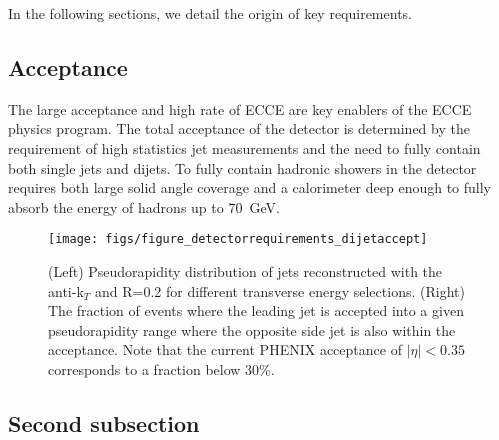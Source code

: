 In the following sections, we detail the origin of key requirements.

\subsection{Acceptance}

The large acceptance and high rate of ECCE are key enablers of the ECCE 
physics program.
The total
acceptance of the detector is determined by the requirement of high
statistics jet measurements and the need to fully contain both single
jets and dijets.  To fully contain hadronic showers in the detector
requires both large solid angle coverage and a calorimeter deep enough
to fully absorb the energy of hadrons up to 70~GeV.

\begin{figure}[hbt!]
 \begin{center}
  \hfill
  \texttt{[image: figs/figure\_detectorrequirements\_dijetaccept]}
  \caption[Pseudorapidity distribution of \pythia jets reconstructed
  with the \fastjet anti-k$_{T}$ and the fraction of events in which
  the leading and subleading jet are in the specified
  acceptance]{\label{fig:pythia_dijet_accept}(Left) Pseudorapidity
    distribution of \pythia jets reconstructed with the \fastjet
    anti-k$_{T}$ and R=0.2 for different transverse energy selections.
    (Right) The fraction of \pythia events where the leading jet is
    accepted into a given pseudorapidity range where the opposite side
    jet is also within the acceptance.  Note that the current PHENIX
    acceptance of $|\eta|<0.35$ corresponds to a fraction below 30\%.}
 \end{center}
\end{figure}

\subsection{Second subsection}
